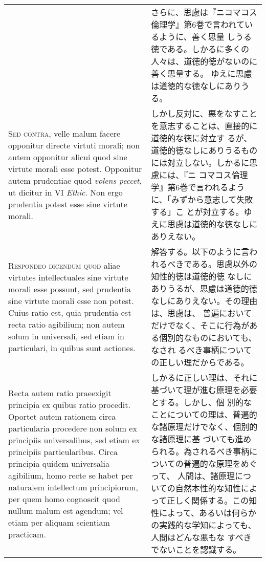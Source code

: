 \documentclass[10pt]{jsarticle}
\begin{document}
\begin{longtable}{p{21em}p{21em}}
&

さらに、思慮は『ニコマコス倫理学』第6巻で言われているように、善く思量
しうる徳である。しかるに多くの人々は、道徳的徳がないのに善く思量する。
ゆえに思慮は道徳的な徳なしにありうる。

\\



{\scshape Sed contra}, velle malum facere opponitur directe virtuti
morali; non autem opponitur alicui quod sine virtute morali esse
potest. Opponitur autem prudentiae quod {\itshape volens peccet}, ut
dicitur in VI {\itshape Ethic}. Non ergo prudentia potest esse sine
virtute morali.

&

しかし反対に、悪をなすことを意志することは、直接的に道徳的な徳に対立す
るが、道徳的徳なしにありうるものには対立しない。しかるに思慮には、『ニ
コマコス倫理学』第6巻で言われるように、「みずから意志して失敗する」こ
とが対立する。ゆえに思慮は道徳的な徳なしにありえない。

\\



{\scshape Respondeo dicendum quod} aliae virtutes intellectuales sine
virtute morali esse possunt, sed prudentia sine virtute morali esse
non potest. Cuius ratio est, quia prudentia est recta ratio agibilium;
non autem solum in universali, sed etiam in particulari, in quibus
sunt actiones.

&

解答する。以下のように言われるべきである。思慮以外の知性的徳は道徳的徳
なしにありうるが、思慮は道徳的徳なしにありえない。その理由は、思慮は、
普遍においてだけでなく、そこに行為がある個別的なものにおいても、なされ
るべき事柄についての正しい理だからである。


 \\


Recta autem ratio praeexigit principia ex quibus ratio
procedit. Oportet autem rationem circa particularia procedere non
solum ex principiis universalibus, sed etiam ex principiis
particularibus. Circa principia quidem universalia agibilium, homo
recte se habet per naturalem intellectum principiorum, per quem homo
cognoscit quod nullum malum est agendum; vel etiam per aliquam
scientiam practicam.

&

しかるに正しい理は、それに基づいて理が進む原理を必要とする。しかし、個
別的なことについての理は、普遍的な諸原理だけでなく、個別的な諸原理に基
づいても進められる。為されるべき事柄についての普遍的な原理をめぐって、
人間は、諸原理についての自然本性的な知性によって正しく関係する。この知
性によって、あるいは何らかの実践的な学知によっても、人間はどんな悪もな
すべきでないことを認識する。


\end{longtable}
\end{document}
